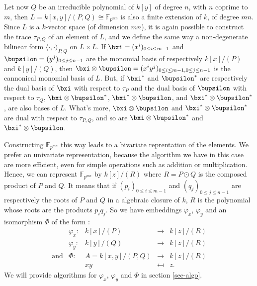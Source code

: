 \documentclass[a4paper,11pt]{article}
\theoremstyle{break}
\theoremstyle{definition}
\theoremstyle{remark}
\newcommand{\ps}[2]{\langle#1,#2\rangle}
\newcommand{\psdot}{\ps{\cdot}{\cdot}}
\begin{document}
Let now $Q$ be an irreducible polynomial of $k[y]$ of degree $n$, with $n$
coprime to $m$, then $L=k[x,y]/(P,Q)\cong \mathbb{F}_{p^{mn}}$ is also a finite 
extension of $k$, of
degree $mn$. Since $L$ is a $k$-vector space (of dimension $mn$), it is again
possible to construct the trace $\tau_{P,Q}$ of an element of $L$, and we define 
the same way
a non-degenerate bilinear form $\psdot_{P,Q}$ on $L\times L$. If
$\bxi=(x^i)_{0\leq i\leq m-1}$ and $\bupsilon=(y^j)_{0\leq j \leq n-1}$ are the
monomial basis of respectively $k[x]/(P)$ and $k[y]/(Q)$, then
$\bxi\otimes\bupsilon=(x^iy^j)_{0\leq i \leq m-1,0\leq j \leq n-1}$ is the
cannonical monomial basis of $L$. But, if $\bxi^*$ and $\bupsilon^*$ are
respectively the dual basis of $\bxi$ with respect to $\tau_P$ and the dual
basis of $\bupsilon$ with respect to $\tau_Q$, $\bxi\otimes\bupsilon^*$, 
$\bxi^*\otimes\bupsilon$, and $\bxi^*\otimes\bupsilon^*$, are also bases of $L$.
What's more, $\bxi\otimes\bupsilon$ and  $\bxi^*\otimes\bupsilon^*$ are dual
with respect to $\tau_{P,Q}$, and so are $\bxi\otimes\bupsilon^*$ and
$\bxi^*\otimes\bupsilon$.

Constructing
$\mathbb{F}_{p^{mn}}$ this way leads to a bivariate reprentation of the
elements. We prefer an univariate representation, because the algorithm we have
in this case are more efficient, even for simple operations such as addition or
multiplication. Hence, we can represent $\mathbb{F}_{p^{mn}}$ by $k[z]/(R)$
where $R=P\odot Q$ is the composed product of $P$ and $Q$. It means that if
$(p_i)_{0\leq i \leq m-1}$ and $(q_j)_{0\leq j\leq n-1}$ are respectively the
roots of $P$ and $Q$ in a algebraic closure of $k$, $R$ is the polynomial whose
roots are the products $p_iq_j$. So we have embeddings $\varphi_x$, $\varphi_y$
and an isomorphism $\Phi$ of the form :
\[
\begin{array}{ccccc}
  &\varphi_x: & k[x]/(P) & \to & k[z]/(R)\\[2mm]
  & \varphi_y: & k[y]/(Q) & \to & k[z]/(R)\\[2mm]
  \text{and}& \Phi:&  A=k[x,y]/(P,Q) & \to & k[z]/(R) \\
  & &  xy & \mapsfrom & z.
\end{array}
\]
We will provide algorithms for $\varphi_x$, $\varphi_y$ and $\Phi$ in section
\ref{sec-algo}.
\end{document}
